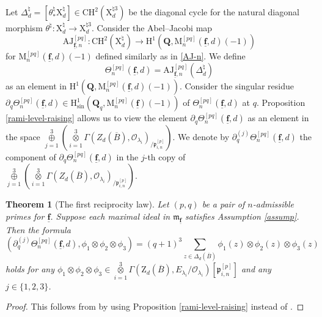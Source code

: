 \documentclass[10pt]{amsart}
\numberwithin{equation}{section}
\theoremstyle{plain}
\newtheorem{theorem}{Theorem}[section]
\numberwithin{equation}{section}
\theoremstyle{definition}
\theoremstyle{remark}
\def\sing{\mathrm{sin}}
\def\frakm{\mathfrak{m}}
\def\triplef{\underline{\mathbf{f}}}
\def\threetensor{\overset{3}{\underset{i=1}\otimes}}
\def\threesum{\overset{3}{\underset{j=1}\oplus} }
\def\calO{\mathcal{O}}
\def\frakm{\mathfrak{m}}
\def\frakp{\mathfrak{p}}
\def\QQ{\mathbf{Q}}
\def\rmH{\mathrm{H}}
\def\rmM{\mathrm{M}}
\def\rmX{\mathrm{X}}
\def\rmZ{\mathrm{Z}}
\begin{document}
Let $\Delta^{\natural}_{d}=[\theta^{\natural}_{\ast}\rmX^{\natural}_{d}]\in \mathrm{CH}^{2}( \rmX^{\natural3}_{d})$ be the diagonal cycle for the natural diagonal morphism $\theta^{\natural}: \rmX^{\natural}_{d}\rightarrow \rmX^{\natural3}_{d}$.
Consider the Abel--Jacobi map 
\begin{equation}\label{AJ-p-n}
\mathrm{AJ}^{[pq]}_{\triplef, n}: \mathrm{CH}^{2}(\rmX^{\natural}_{d})\rightarrow \rmH^{1}(\QQ,  \rmM^{[{pq}]}_{n}(\triplef, d)(-1))
\end{equation}
for $\rmM^{[{pq}]}_{n}(\triplef, d)(-1)$ defined similarly as in \eqref{AJ-n}. We define 
\begin{equation*}
\Theta^{[{pq}]}_{n}(\triplef, d)= \mathrm{AJ}^{[pq]}_{\triplef, n}(\Delta^{\natural}_{d})
\end{equation*}
as an element in $\rmH^{1}(\QQ,  \rmM^{[{pq}]}_{n}(\triplef, d)(-1))$. Consider the singular residue $\partial_{q}\Theta^{[pq]} _{n}(\triplef, d)\in  \rmH^{1}_{\sing}(\QQ_{q}, \rmM^{[pq]}_{n}(\triplef)(-1))$ of $\Theta^{[{pq}]}_{n}(\triplef, d)$ at $q$. Proposition \ref{rami-level-raising} allows us to view the element $\partial_{q}\Theta^{[pq]} _{n}(\triplef, d)$ as an element in the space $\threesum(\threetensor\Gamma(Z_{d}(\overline{B}),\calO_{\lambda_{i}})_{/\frakp^{[p]}_{i, n}})$. We denote by $\partial^{(j)}_{q}\Theta^{[pq]} _{n}(\triplef, d)$ the component of $\partial_{q}\Theta^{[pq]} _{n}(\triplef, d)$ in the $j$-th copy of 
 $\threesum(\threetensor\Gamma(Z_{d}(\overline{B}),\calO_{\lambda_{i}})_{/\frakp^{[p]}_{i, n}})$.  
 \begin{theorem}[The first reciprocity law]\label{1-law}
 Let $(p, q)$ be a pair of $n$-admissible primes for $\triplef$. Suppose each maximal ideal in $\frakm_{\triplef}$ satisfies Assumption \ref{assump}.  
Then the formula 
 \begin{equation*}
 (\partial^{(j)}_{q}\Theta^{[pq]} _{n}(\triplef, d), \phi_{1}\otimes \phi_{2}\otimes \phi_{3})=(q+1)^{3}\sum_{z\in \Delta_{d}(\overline{B})} \phi_{1}(z)\otimes \phi_{2}(z)\otimes \phi_{3}(z)
 \end{equation*}
 holds for any $\phi_{1}\otimes \phi_{2}\otimes \phi_{3}\in \threetensor\Gamma(\rmZ_{d}(\overline{B}),E_{\lambda_{i}}/\calO_{\lambda_{i}})[\frakp^{[p]}_{i, n}]$ and any $j\in\{1, 2, 3\}$. 
 \end{theorem}
 \begin{proof}
This follows from \cite[Theorem 4.12]{Wang} by using Proposition \ref{rami-level-raising} instead of \cite[Theorem 4.7, Corollary 4.11]{Wang}.  
 \end{proof}
 
\end{document}
